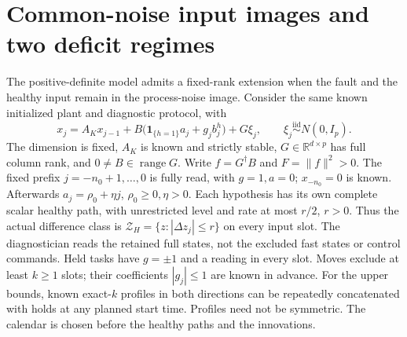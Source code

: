 \documentclass[11pt]{article}
\begin{document}
\section{Common-noise input images and two deficit regimes}
\label{m2sreg:section}

The positive-definite model admits a fixed-rank extension when the fault
and the healthy input remain in the process-noise image. Consider the
same known initialized plant and diagnostic protocol, with
\begin{equation}\label{m2sreg:plant}
x_j=A_Kx_{j-1}+B\bigl(\mathbf1_{\{h=1\}}a_j+g_jb_j^h\bigr)+G\xi_j,
\qquad \xi_j\overset{\mathrm{iid}}{\sim}N(0,I_p).
\end{equation}
The dimension is fixed, $A_K$ is known and strictly stable,
$G\in\mathbb R^{d\times p}$ has full column rank, and
$0\ne B\in\operatorname{range}G$. Write
$f=G^\dagger B$ and $F=\|f\|^2>0$.
The fixed prefix $j=-n_0+1,\ldots,0$ is fully read, with $g=1,a=0$;
$x_{-n_0}=0$ is known. Afterwards $a_j=\rho_0+\eta j$,
$\rho_0\ge0,\eta>0$. Each hypothesis has its own complete scalar
healthy path, with unrestricted level and rate at most $r/2$, $r>0$.
Thus the actual difference class is
$\mathcal Z_H=\{z:|\Delta z_j|\le r\}$ on every input slot.
The diagnostician reads the retained full states, not the excluded fast
states or control commands. Held tasks have $g=\pm1$ and a reading in
every slot. Moves exclude at least $k\ge1$ slots; their coefficients
$|g_j|\le1$ are known in advance. For the upper bounds, known
exact-$k$ profiles in both directions can be repeatedly concatenated
with holds at any planned start time. Profiles need not be symmetric.
The calendar is chosen before the healthy paths and the innovations.
\end{document}
